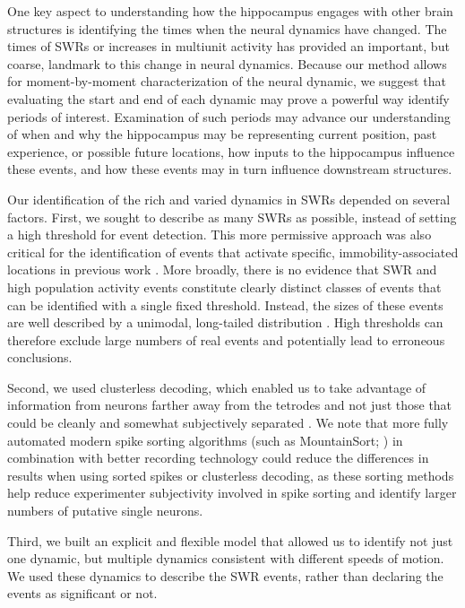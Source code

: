 \documentclass[9pt,lineno]{elife}
\begin{document}
One key aspect to understanding how the hippocampus engages with other brain structures is identifying the times when the neural dynamics have changed. The times of SWRs or increases in multiunit activity  has provided an important, but coarse, landmark to this change in neural dynamics. Because our method allows for moment-by-moment characterization of the neural dynamic, we suggest that evaluating the start and end of each dynamic may prove a powerful way identify periods of interest. Examination of such periods may advance our understanding of when and why the hippocampus may be representing current position, past experience, or possible future locations, how inputs to the hippocampus influence these events, and how these events may in turn influence downstream structures.

Our identification of the rich and varied dynamics in SWRs depended on several factors. First, we sought to describe as many SWRs as possible, instead of setting a high threshold for event detection. This more permissive approach was also critical for the identification of events that activate specific, immobility-associated locations in previous work \citep{YuDistincthippocampalcorticalmemory2017}. More broadly, there is no evidence that SWR and high population activity events constitute clearly distinct classes of events that can be identified with a single fixed threshold. Instead, the sizes of these events are well described by a unimodal, long-tailed distribution \citep{YuDistincthippocampalcorticalmemory2017}. High thresholds can therefore exclude large numbers of real events and potentially lead to erroneous conclusions.

Second, we used clusterless decoding, which enabled us to take advantage of information from neurons farther away from the tetrodes and not just those that could be cleanly and somewhat subjectively separated \citep{ChenTransductiveneuraldecoding2012, KloostermanBayesiandecodingusing2014, DengRapidclassificationhippocampal2016}. We note that more fully automated modern spike sorting algorithms (such as MountainSort; \cite{ChungFullyAutomatedApproach2017}) in combination with better recording technology could reduce the differences in results when using sorted spikes or clusterless decoding, as these sorting methods help reduce  experimenter subjectivity involved in spike sorting and identify larger numbers of putative single neurons.  

Third, we built an explicit and flexible model that allowed us to identify not just one dynamic, but multiple dynamics consistent with different speeds of motion. We used these dynamics to describe the SWR events, rather than declaring the events as significant or not.
\end{document}
